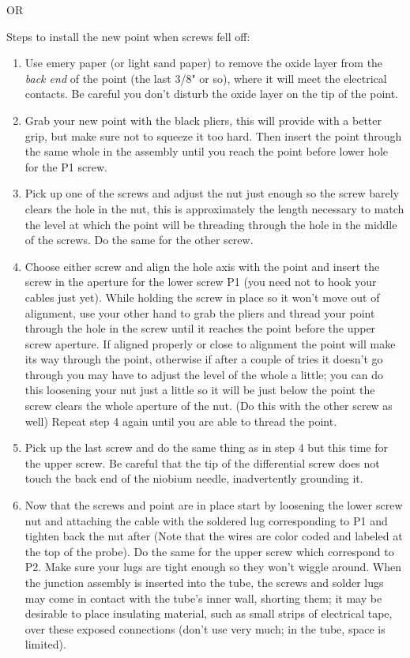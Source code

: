 \documentclass{../lab}
\begin{document}
\noindent OR

\noindent Steps to install the new point when screws fell off:

\begin{enumerate}
    \item Use emery paper (or light sand paper) to remove the oxide layer from the \emph{back end }of the point (the last 3/8" or so), where it will meet the electrical contacts. Be careful you don't disturb the oxide layer on the tip of the point.

    \item Grab your new point with the black pliers, this will provide with a better grip, but make sure not to squeeze it too hard. Then insert the point through the same whole in the assembly until you reach the point before lower hole for the P1 screw.

    \item Pick up one of the screws and adjust the nut just enough so the screw barely clears the hole in the nut, this is approximately the length necessary to match the level at which the point will be threading through the hole in the middle of the screws. Do the same for the other screw.

    \item Choose either screw and align the hole axis with the point and insert the screw in the aperture for the lower screw P1 (you need not to hook your cables just yet). While holding the screw in place so it won't move out of alignment, use your other hand to grab the pliers and thread your point through the hole in the screw until it reaches the point before the upper screw aperture. If aligned properly or close to alignment the point will make its way through the point, otherwise if after a couple of tries it doesn't go through you may have to adjust the level of the whole a little; you can do this loosening your nut just a little so it will be just below the point the screw clears the whole aperture of the nut. (Do this with the other screw as well)  Repeat step 4 again until you are able to thread the point.

    \item Pick up the last screw and do the same thing as in step 4 but this time for the upper screw. Be careful that the tip of the differential screw does not touch the back end of the niobium needle, inadvertently grounding it.

    \item Now that the screws and point are in place start by loosening the lower screw nut and attaching the cable with the soldered lug corresponding to P1 and tighten back the nut after (Note that the wires are color coded and labeled at the top of the probe). Do the same for the upper screw which correspond to P2. Make sure your lugs are tight enough so they won't wiggle around. When the junction assembly is inserted into the tube, the screws and solder lugs may come in contact with the tube's inner wall, shorting them; it may be desirable to place insulating material, such as small strips of electrical tape, over these exposed connections (don't use very much; in the tube, space is limited).

\end{enumerate}
\end{document}
